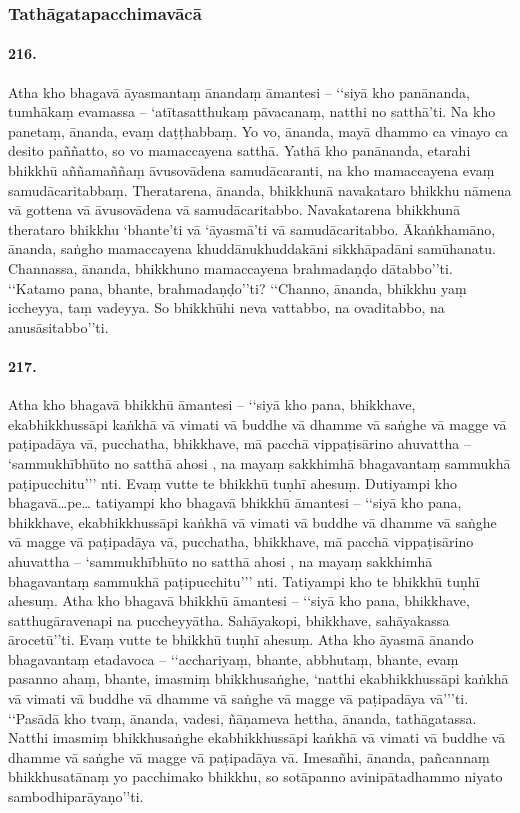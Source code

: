
\subsubsection{Tathāgatapacchimavācā}

\paragraph{216.} Atha kho bhagavā āyasmantaṃ ānandaṃ āmantesi – ‘‘siyā kho panānanda, tumhākaṃ evamassa – ‘atītasatthukaṃ pāvacanaṃ, natthi no satthā’ti. Na kho panetaṃ, ānanda, evaṃ daṭṭhabbaṃ. Yo vo, ānanda, mayā dhammo ca vinayo ca desito paññatto, so vo mamaccayena satthā. Yathā kho panānanda, etarahi bhikkhū aññamaññaṃ āvusovādena samudācaranti, na kho mamaccayena evaṃ samudācaritabbaṃ. Theratarena, ānanda, bhikkhunā navakataro bhikkhu nāmena vā gottena vā āvusovādena vā samudācaritabbo. Navakatarena bhikkhunā therataro bhikkhu ‘bhante’ti vā ‘āyasmā’ti vā samudācaritabbo. Ākaṅkhamāno, ānanda, saṅgho mamaccayena khuddānukhuddakāni sikkhāpadāni samūhanatu. Channassa, ānanda, bhikkhuno mamaccayena brahmadaṇḍo dātabbo’’ti. ‘‘Katamo pana, bhante, brahmadaṇḍo’’ti? ‘‘Channo, ānanda, bhikkhu yaṃ iccheyya, taṃ vadeyya. So bhikkhūhi neva vattabbo, na ovaditabbo, na anusāsitabbo’’ti.

\paragraph{217.} Atha kho bhagavā bhikkhū āmantesi – ‘‘siyā kho pana, bhikkhave, ekabhikkhussāpi kaṅkhā vā vimati vā buddhe vā dhamme vā saṅghe vā magge vā paṭipadāya vā, pucchatha, bhikkhave, mā pacchā vippaṭisārino ahuvattha – ‘sammukhībhūto no satthā ahosi , na mayaṃ sakkhimhā bhagavantaṃ sammukhā paṭipucchitu’’’ nti. Evaṃ vutte te bhikkhū tuṇhī ahesuṃ. Dutiyampi kho bhagavā…pe… tatiyampi kho bhagavā bhikkhū āmantesi – ‘‘siyā kho pana, bhikkhave, ekabhikkhussāpi kaṅkhā vā vimati vā buddhe vā dhamme vā saṅghe vā magge vā paṭipadāya vā, pucchatha, bhikkhave, mā pacchā vippaṭisārino ahuvattha – ‘sammukhībhūto no satthā ahosi , na mayaṃ sakkhimhā bhagavantaṃ sammukhā paṭipucchitu’’’ nti. Tatiyampi kho te bhikkhū tuṇhī ahesuṃ. Atha kho bhagavā bhikkhū āmantesi – ‘‘siyā kho pana, bhikkhave, satthugāravenapi na puccheyyātha. Sahāyakopi, bhikkhave, sahāyakassa ārocetū’’ti. Evaṃ vutte te bhikkhū tuṇhī ahesuṃ. Atha kho āyasmā ānando bhagavantaṃ etadavoca – ‘‘acchariyaṃ, bhante, abbhutaṃ, bhante, evaṃ pasanno ahaṃ, bhante, imasmiṃ bhikkhusaṅghe, ‘natthi ekabhikkhussāpi kaṅkhā vā vimati vā buddhe vā dhamme vā saṅghe vā magge vā paṭipadāya vā’’’ti. ‘‘Pasādā kho tvaṃ, ānanda, vadesi, ñāṇameva hettha, ānanda, tathāgatassa. Natthi imasmiṃ bhikkhusaṅghe ekabhikkhussāpi kaṅkhā vā vimati vā buddhe vā dhamme vā saṅghe vā magge vā paṭipadāya vā. Imesañhi, ānanda, pañcannaṃ bhikkhusatānaṃ yo pacchimako bhikkhu, so sotāpanno avinipātadhammo niyato sambodhiparāyaṇo’’ti.

